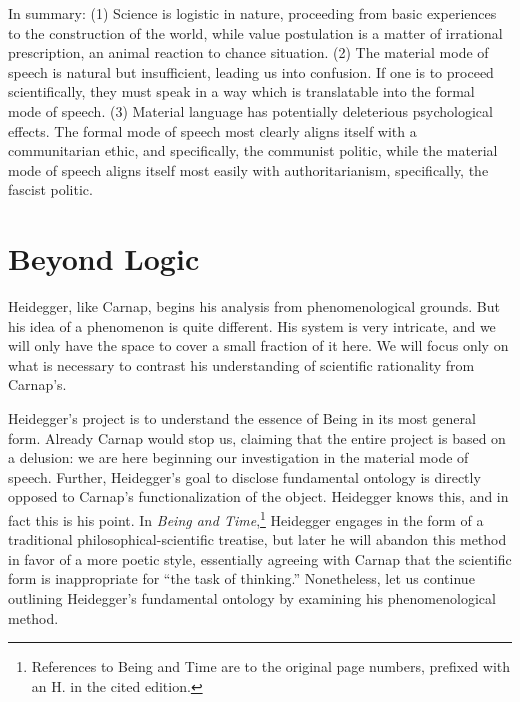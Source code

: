 \documentclass[leqno, 12pt]{turabian-researchpaper}
\begin{document}
	In summary: (1) Science is logistic in nature, proceeding from basic
	experiences to the construction of the world, while value postulation is a matter
	of irrational prescription, an animal reaction to chance situation. (2) The material
	mode of speech is natural but insufficient, leading us into confusion. If one is
	to proceed scientifically, they must speak in a way which is translatable into
	the formal mode of speech. (3) Material language has potentially deleterious psychological
	effects. The formal mode of speech most clearly aligns itself with a
	communitarian ethic, and specifically, the communist politic, while the material
	mode of speech aligns itself most easily with authoritarianism, specifically, the
	fascist politic.

	\section{Beyond Logic}

	Heidegger, like Carnap, begins his analysis from phenomenological grounds. But
	his idea of a phenomenon is quite different. His system is very intricate, and
	we will only have the space to cover a small fraction of it here. We will
	focus only on what is necessary to contrast his understanding of scientific
	rationality from Carnap's.

	Heidegger's project is to understand the essence of Being in its most general
	form. Already Carnap would stop us, claiming that the entire project is based
	on a delusion: we are here beginning our investigation in the material mode of
	speech. Further, Heidegger's goal to disclose fundamental ontology is directly
	opposed to Carnap's functionalization of the object. Heidegger knows this, and
	in fact this is his point. In \textit{Being and Time},\footnote{References to
	Being and Time are to the original page numbers, prefixed with an H. in the
	cited edition.} Heidegger engages in the form of a traditional philosophical-scientific
	treatise, but later he will abandon this method in favor of a more poetic
	style, essentially agreeing with Carnap that the scientific form is inappropriate
	for \enquote{the task of thinking.} Nonetheless, let us continue outlining Heidegger's
	fundamental ontology by examining his phenomenological method.
\end{document}
